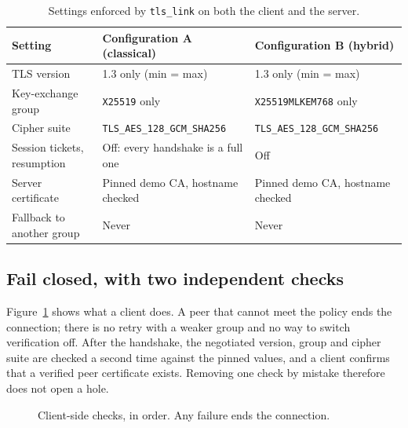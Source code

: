 \documentclass[11pt,a4paper]{article}
\begin{document}
\begin{table}[h]
\centering
\caption{Settings enforced by \texttt{tls\_link} on both the client and the server.}
\label{tab:pinned}
\small
\begin{tabularx}{\linewidth}{@{}lXX@{}}
\toprule
Setting & Configuration A (classical) & Configuration B (hybrid) \\
\midrule
TLS version & 1.3 only (min = max) & 1.3 only (min = max) \\
Key-exchange group & \texttt{X25519} only & \texttt{X25519MLKEM768} only \\
Cipher suite & \texttt{TLS\_AES\_128\_GCM\_SHA256} & \texttt{TLS\_AES\_128\_GCM\_SHA256} \\
Session tickets, resumption & Off: every handshake is a full one & Off \\
Server certificate & Pinned demo CA, hostname checked & Pinned demo CA, hostname checked \\
Fallback to another group & Never & Never \\
\bottomrule
\end{tabularx}
\end{table}

\subsection{Fail closed, with two independent checks}

Figure~\ref{fig:policy} shows what a client does. A peer that cannot meet the policy ends the
connection; there is no retry with a weaker group and no way to switch verification off. After
the handshake, the negotiated version, group and cipher suite are checked a second time against
the pinned values, and a client confirms that a verified peer certificate exists. Removing one
check by mistake therefore does not open a hole.

\begin{figure}[h]
\centering
{}
\caption{Client-side checks, in order. Any failure ends the connection.}
\label{fig:policy}
\end{figure}
\end{document}

